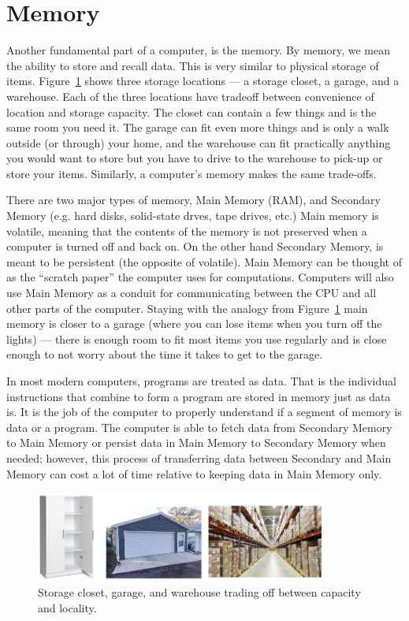 \section{Memory}

Another fundamental part of a computer, is the memory. By memory, we mean the
ability to store and recall data. This is very similar to physical storage of
items. Figure~\ref{fig:hardware:storage} shows three storage locations ---
a storage closet, a garage, and a warehouse. Each of the three locations
have tradeoff between convenience of location and storage capacity. The
closet can contain a few things and is the same room you need it. The garage
can fit even more things and is only a walk outside (or through) your home,
and the warehouse can fit practically anything you would want to store but you
have to drive to the warehouse to pick-up or store your items.
Similarly, a computer's memory makes the same trade-offs.

There are two major types
of memory, Main Memory (RAM), and Secondary Memory (e.g. hard disks, solid-state
drves, tape drives, etc.) Main memory is volatile, meaning that the contents
of the memory is not preserved when a computer is turned off and back on. On the
other hand Secondary Memory, is meant to be persistent (the opposite of volatile).
Main Memory can be thought of as the ``scratch paper'' the computer uses for
computations. Computers will also use Main Memory as a conduit for communicating
between the CPU and all other parts of the computer. Staying with the analogy
from Figure~\ref{fig:hardware:storage} main memory is closer to a garage
(where you can lose items when you turn off the lights) --- there is enough
room to fit most items you use regularly and is close enough to not worry
about the time it takes to get to the garage.

In most modern computers,
programs are treated as data. That is the individual instructions that combine
to form a program are stored in memory just as data is. It is the job of the
computer to properly understand if a segment of memory is data or a program.
The computer is able to fetch data from Secondary Memory to Main Memory or
persist data in Main Memory to Secondary Memory when needed; however,
this process of transferring data between Secondary and Main Memory can
cost a lot of time relative to keeping data in Main Memory only.

\begin{figure}
	\centering
	\includegraphics[width=0.85\textwidth]{images/storage.png}
	\caption{Storage closet, garage, and warehouse trading off between
                 capacity and locality.}
	\label{fig:hardware:storage}
\end{figure}

